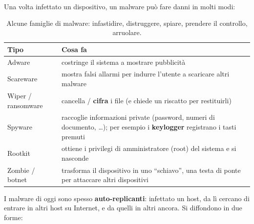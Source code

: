 
Una volta infettato un dispositivo, un malware può fare danni in molti modi:

\begin{table}[H]
\centering
\begin{tabular}{lp{11cm}}
\toprule
\textbf{Tipo} & \textbf{Cosa fa} \\
\midrule
Adware & costringe il sistema a mostrare pubblicità \\
Scareware & mostra falsi allarmi per indurre l'utente a scaricare altri malware \\
Wiper / ransomware & cancella / \textbf{cifra} i file (e chiede un riscatto per restituirli) \\
Spyware & raccoglie informazioni private (password, numeri di documento, \dots); per esempio i \textbf{keylogger} registrano i tasti premuti \\
Rootkit & ottiene i privilegi di amministratore (root) del sistema e si nasconde \\
Zombie / botnet & trasforma il dispositivo in uno ``schiavo'', una testa di ponte per attaccare altri dispositivi \\
\bottomrule
\end{tabular}
\caption{Alcune famiglie di malware: infastidire, distruggere, spiare, prendere il controllo, arruolare.}
\end{table}

I malware di oggi sono spesso \textbf{auto-replicanti}: infettato un host, da lì cercano di entrare in altri host su Internet, e da quelli in
altri ancora. Si diffondono in due forme:


